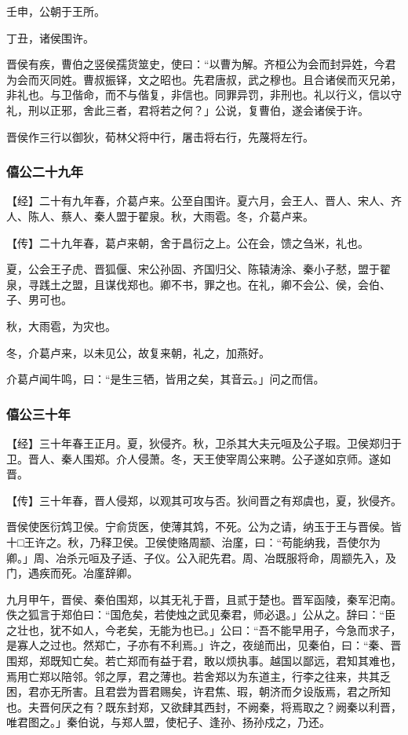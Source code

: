\documentclass[]{article}
\begin{document}
壬申，公朝于王所。

丁丑，诸侯围许。

晋侯有疾，曹伯之竖侯孺货筮史，使曰：``以曹为解。齐桓公为会而封异姓，今君为会而灭同姓。曹叔振铎，文之昭也。先君唐叔，武之穆也。且合诸侯而灭兄弟，非礼也。与卫偕命，而不与偕复，非信也。同罪异罚，非刑也。礼以行义，信以守礼，刑以正邪，舍此三者，君将若之何？」公说，复曹伯，遂会诸侯于许。

晋侯作三行以御狄，荀林父将中行，屠击将右行，先蔑将左行。

\hypertarget{header-n990}{%
\subsubsection{僖公二十九年}\label{header-n990}}

【经】二十有九年春，介葛卢来。公至自围许。夏六月，会王人、晋人、宋人、齐人、陈人、蔡人、秦人盟于翟泉。秋，大雨雹。冬，介葛卢来。

【传】二十九年春，葛卢来朝，舍于昌衍之上。公在会，馈之刍米，礼也。

夏，公会王子虎、晋狐偃、宋公孙固、齐国归父、陈辕涛涂、秦小子憖，盟于翟泉，寻践土之盟，且谋伐郑也。卿不书，罪之也。在礼，卿不会公、侯，会伯、子、男可也。

秋，大雨雹，为灾也。

冬，介葛卢来，以未见公，故复来朝，礼之，加燕好。

介葛卢闻牛鸣，曰：``是生三牺，皆用之矣，其音云。」问之而信。

\hypertarget{header-n999}{%
\subsubsection{僖公三十年}\label{header-n999}}

【经】三十年春王正月。夏，狄侵齐。秋，卫杀其大夫元咺及公子瑕。卫侯郑归于卫。晋人、秦人围郑。介人侵萧。冬，天王使宰周公来聘。公子遂如京师。遂如晋。

【传】三十年春，晋人侵郑，以观其可攻与否。狄间晋之有郑虞也，夏，狄侵齐。

晋侯使医衍鸩卫侯。宁俞货医，使薄其鸩，不死。公为之请，纳玉于王与晋侯。皆十□王许之。秋，乃释卫侯。卫侯使赂周颛、治廑，曰：``苟能纳我，吾使尔为卿。」周、冶杀元咺及子适、子仪。公入祀先君。周、冶既服将命，周颛先入，及门，遇疾而死。冶廑辞卿。

九月甲午，晋侯、秦伯围郑，以其无礼于晋，且贰于楚也。晋军函陵，秦军汜南。佚之狐言于郑伯曰：``国危矣，若使烛之武见秦君，师必退。」公从之。辞曰：``臣之壮也，犹不如人，今老矣，无能为也已。」公曰：``吾不能早用子，今急而求子，是寡人之过也。然郑亡，子亦有不利焉。」许之，夜缒而出，见秦伯，曰：``秦、晋围郑，郑既知亡矣。若亡郑而有益于君，敢以烦执事。越国以鄙远，君知其难也，焉用亡郑以陪邻。邻之厚，君之薄也。若舍郑以为东道主，行李之往来，共其乏困，君亦无所害。且君尝为晋君赐矣，许君焦、瑕，朝济而夕设版焉，君之所知也。夫晋何厌之有？既东封郑，又欲肆其西封，不阙秦，将焉取之？阙秦以利晋，唯君图之。」秦伯说，与郑人盟，使杞子、逢孙、扬孙戍之，乃还。
\end{document}
